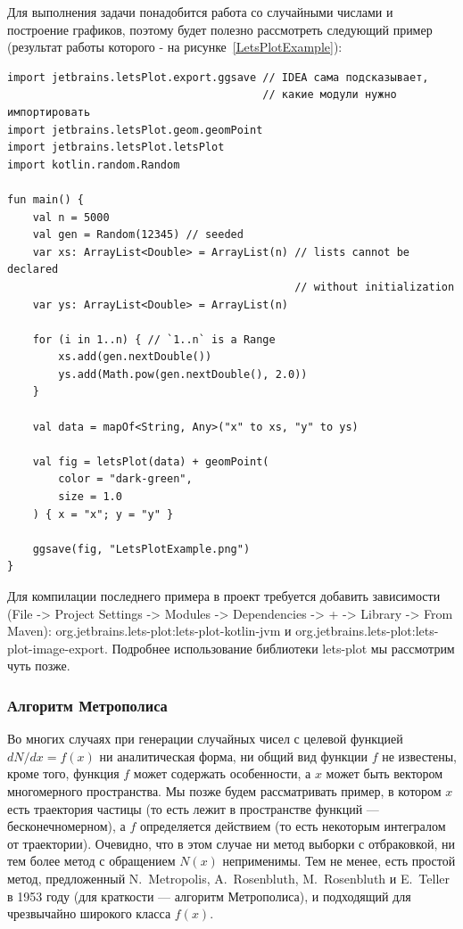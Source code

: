 \documentclass{book}
\begin{document}
Для выполнения задачи понадобится работа со случайными числами и построение графиков, поэтому будет
полезно рассмотреть следующий пример (результат работы которого - на
рисунке~\ref{LetsPlotExample}):
\begin{verbatim}
import jetbrains.letsPlot.export.ggsave // IDEA сама подсказывает,
                                        // какие модули нужно импортировать
import jetbrains.letsPlot.geom.geomPoint
import jetbrains.letsPlot.letsPlot
import kotlin.random.Random

fun main() {
    val n = 5000
    val gen = Random(12345) // seeded
    var xs: ArrayList<Double> = ArrayList(n) // lists cannot be declared
                                             // without initialization
    var ys: ArrayList<Double> = ArrayList(n)

    for (i in 1..n) { // `1..n` is a Range
        xs.add(gen.nextDouble())
        ys.add(Math.pow(gen.nextDouble(), 2.0))
    }

    val data = mapOf<String, Any>("x" to xs, "y" to ys)

    val fig = letsPlot(data) + geomPoint(
        color = "dark-green",
        size = 1.0
    ) { x = "x"; y = "y" }

    ggsave(fig, "LetsPlotExample.png")
}
\end{verbatim}

Для компилации последнего примера в проект требуется добавить зависимости (File -> Project Settings
-> Modules -> Dependencies -> + -> Library -> From Maven):
org.jetbrains.lets-plot:lets-plot-kotlin-jvm и org.jetbrains.lets-plot:lets-plot-image-export. 
Подробнее использование библиотеки lets-plot мы рассмотрим чуть позже.

\subsubsection{Алгоритм Метрополиса}

Во многих случаях при генерации случайных чисел с целевой функцией $dN/dx = f(x)$ ни аналитическая
форма, ни общий вид функции $f$ не известены, кроме того, функция $f$ может содержать особенности,
а $x$ может быть вектором многомерного пространства. Мы позже будем
рассматривать пример, в котором $x$ есть траектория частицы (то есть лежит в пространстве функций
--- бесконечномерном), а $f$ определяется действием (то есть некоторым интегралом от траектории).
Очевидно, что в этом случае ни метод выборки с отбраковкой, ни тем более метод с обращением $N(x)$
неприменимы. Тем не менее, есть простой метод, предложенный N.~Metropolis, A.~Rosenbluth,
M.~Rosenbluth и E.~Teller в 1953 году (для краткости --- алгоритм Метрополиса), и подходящий для
чрезвычайно широкого класса $f(x)$.
\end{document}
